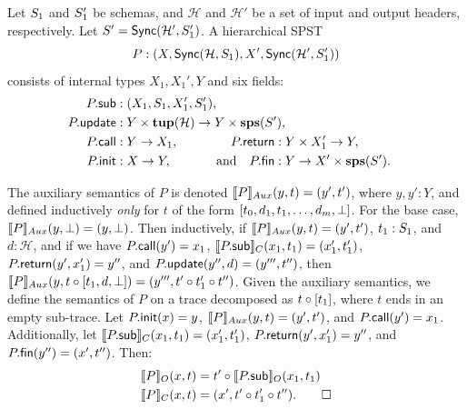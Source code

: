 \begin{definition}
Let $\ss_1$ and $\ss_1'$ be schemas, and $\mathcal{H}$ and $\mathcal{H}'$
be a set of input and output headers, respectively.
Let $\ss' = \hier{\mathcal{H}'}{\ss_1'}$.
A hierarchical SPST
\[
P : (X, \hier{\mathcal{H}}{\ss_1}, X', \hier{\mathcal{H}'}{\ss_1'})
\]
consists of internal types $X_1, X_1', Y$ and
six fields:
\begin{alignat*}{3}
\spstfield{P}{sub} &: (X_1, \ss_1, X_1', \ss_1'),
    \hspace{-1em} \\
\spstfield{P}{update} &: Y \times \tup(\mathcal{H}) \to Y \times \sps(\ss'),
    \hspace{-8em} \\
\spstfield{P}{call} &: Y \to X_1,
    &\spstfield{P}{return} &: Y \times X_1' \to Y, \\
\spstfield{P}{init} &: X \to Y,
    &\text{and} \quad \spstfield{P}{fin} &: Y \to X' \times \sps(\ss').
\end{alignat*}

The auxiliary semantics of $P$ is denoted
$\spstsemI{y}{t}{P} = (y', t')$, where $y, y': Y$,
and defined inductively
\emph{only} for $t$
of the form $[t_0, d_1, t_1, \ldots, d_m, \spsemp{}]$.
For the base case, $\spstsemI{y}{\spsemp{}}{P} = (y, \spsemp{})$.
Then inductively, if
$\spstsemI{y}{t}{P} = (y', t')$,
$t_1: \ss_1$, and
$d: \mathcal{H}$,
and if we have
$\spstfield{P}{call}(y') = x_1$,
$\spstsemC{x_1}{t_1}{\spstfield{P}{sub}} = (x_1', t_1')$,
$\spstfield{P}{return}(y', x_1') = y''$,
and $\spstfield{P}{update}(y'', d) = (y''', t'')$,
then
$\spstsemI{y}{t \circ \spsseq{t_1, d, \spsemp}}{P} = (y''', t' \circ t_1' \circ t'')$.
Given the auxiliary semantics, we define the semantics
of $P$ on a trace decomposed as $t \circ \spsseq{t_1}$,
where $t$ ends in an empty sub-trace.
Let
$\spstfield{P}{init}(x) = y$,
$\spstsemI{y}{t}{P} = (y', t')$,
and $\spstfield{P}{call}(y') = x_1$.
Additionally, let
$\spstsemC{x_1}{t_1}{\spstfield{P}{sub}} = (x_1', t_1')$,
$\spstfield{P}{return}(y', x_1') = y''$,
and $\spstfield{P}{fin}(y'') = (x', t'')$.
Then:
\begin{align*}
\spstsemO{x}{t}{P}
    &= t' \circ \spstsemO{x_1}{t_1}{\spstfield{P}{sub}} \\
\spstsemC{x}{t}{P}
    &= (x', t' \circ t_1' \circ t''). \qed
\end{align*}
\end{definition}


